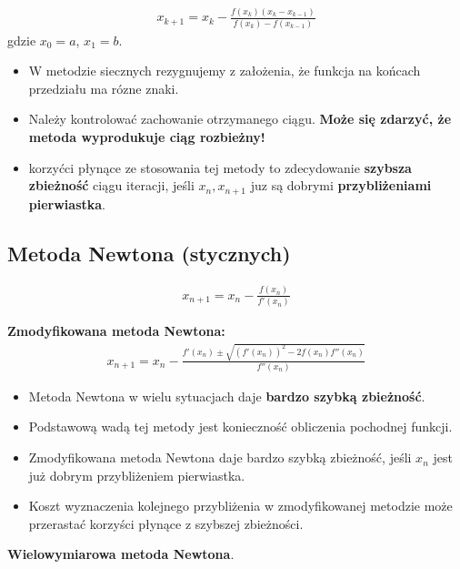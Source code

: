 \documentclass[12pt]{article}
\begin{document}
    \begin{align*}
        x_{k+1} = x_k - \frac{f(x_k)(x_k - x_{k-1})}{f(x_k) - f(x_{k-1})}
    \end{align*}
    gdzie $x_0 = a$, $x_1 = b$.

    \begin{itemize}
        \item W metodzie siecznych rezygnujemy z założenia, że funkcja na końcach przedziału ma rózne znaki.
        \item Należy kontrolować zachowanie otrzymanego ciągu. \textbf{Może się zdarzyć, że metoda wyprodukuje ciąg rozbieżny!}
        \item korzyćci płynące ze stosowania tej metody to zdecydowanie \textbf{szybsza zbieżność} ciągu iteracji, jeśli
        $x_n, x_{n+1}$ juz są dobrymi \textbf{przybliżeniami pierwiastka}.
    \end{itemize}

    \subsection{Metoda Newtona (stycznych)}

    \begin{align*}
        x_{n+1} = x_n - \frac{f(x_n)}{f'(x_n)}
    \end{align*}

    \textbf{Zmodyfikowana metoda Newtona:}
    \begin{align*}
        x_{n+1} = x_n - \frac{f'(x_n) \pm \sqrt{(f'(x_n))^2 - 2f(x_n)f''(x_n)}}{f''(x_n)}
    \end{align*}


    \begin{itemize}
        \item Metoda Newtona w wielu sytuacjach daje \textbf{bardzo szybką zbieżność}.
        \item Podstawową wadą tej metody jest konieczność obliczenia pochodnej funkcji.
        \item Zmodyfikowana metoda Newtona daje bardzo szybką zbieżność, jeśli $x_n$ jest już dobrym przybliżeniem
        pierwiastka.
        \item Koszt wyznaczenia kolejnego przybliżenia w zmodyfikowanej metodzie może przerastać korzyści płynące
        z szybszej zbieżności.
    \end{itemize}

    \textbf{Wielowymiarowa metoda Newtona}.\\
\end{document}
